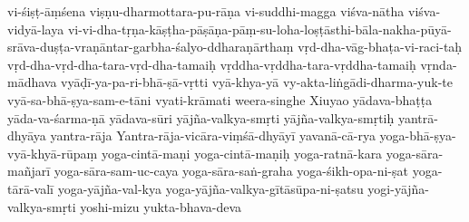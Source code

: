 {vi-śiṣṭ-āṃśena
viṣṇu-dharmottara-pu-rāṇa
vi-suddhi-magga
viśva-nātha
viśva-vidyā-laya
vi-vi-dha-tṛṇa-kāṣṭha-pāṣāṇa-pāṃ-su-loha-loṣṭāsthi-bāla-nakha-pūyā-srāva-duṣṭa-vraṇāntar-garbha-śalyo-ddharaṇārthaṃ
vṛd-dha-vāg-bhaṭa-vi-raci-taḥ
vṛd-dha-vṛd-dha-tara-vṛd-dha-tamaiḥ
vṛddha-vṛddha-tara-vṛddha-tamaiḥ
vṛnda-mādhava
vyāḍī-ya-pa-ri-bhā-ṣā-vṛtti
vyā-khya-yā
vy-akta-liṅgādi-dharma-yuk-te
vyā-sa-bhā-ṣya-sam-e-tāni
vyati-krāmati
weera-singhe
Xiuyao
yādava-bhaṭṭa
yāda-va-śarma-ṇā
yādava-sūri
yājña-valkya-smṛti
yājña-valkya-smṛtiḥ
yantrā-dhyāya
yantra-rāja
Yantra-rāja-vicāra-viṃśā-dhyāyī
yavanā-cā-rya
yoga-bhā-ṣya-vyā-khyā-rūpaṃ
yoga-cintā-maṇi
yoga-cintā-maṇiḥ
yoga-ratnā-kara
yoga-sāra-mañjarī
yoga-sāra-sam-uc-caya
yoga-sāra-saṅ-graha
yoga-śikh-opa-ni-ṣat
yoga-tārā-valī
yoga-yājña-val-kya
yoga-yājña-valkya-gītāsūpa-ni-ṣatsu
yogi-yājña-valkya-smṛti
yoshi-mizu
yukta-bhava-deva
}

